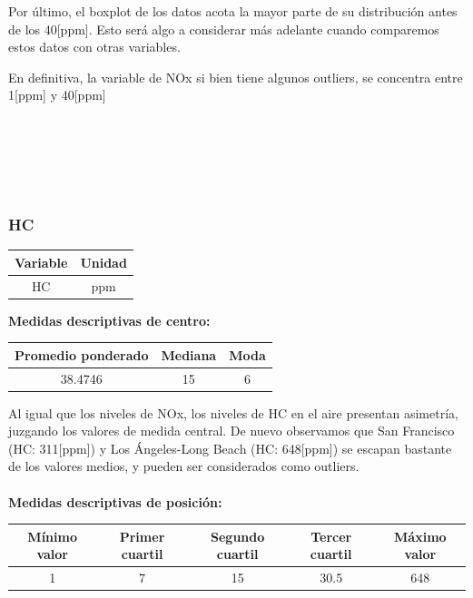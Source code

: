 \documentclass[11pt]{article}
\begin{document}
Por último, el boxplot de los datos acota la mayor parte de su distribución antes de los 40[ppm]. Esto será algo a considerar más adelante cuando comparemos estos datos con otras variables. 

En definitiva, la variable de NOx si bien tiene algunos outliers, se concentra entre 1[ppm] y 40[ppm]
\\
\\
\\
\\
\\
\\

\subsubsection{HC}

\begin{center}
\begin{tabular}{|c|c|}
    \hline
    Variable & Unidad  \\ \hline
    HC & ppm \\
    \hline
\end{tabular}
\end{center}

\textbf{Medidas descriptivas de centro:}

\begin{center}
\begin{tabular}{|c|c|c|}
    \hline
    Promedio ponderado & Mediana & Moda \\ \hline
    38.4746 & 15 & 6 \\
    \hline
\end{tabular}
\end{center}

Al igual que los niveles de NOx, los niveles de HC en el aire presentan asimetría, juzgando los valores de medida central. De nuevo observamos que San Francisco (HC: 311[ppm]) y Los Ángeles-Long Beach (HC: 648[ppm]) se escapan bastante de los valores medios, y pueden ser considerados como outliers.
\\
\\
\textbf{Medidas descriptivas de posición:}

\begin{center}
\begin{tabular}{|c|c|c|c|c|}
    \hline
    Mínimo valor & Primer cuartil & Segundo cuartil & Tercer cuartil & Máximo valor\\ \hline
    1 & 7 & 15 & 30.5 & 648\\
    \hline
\end{tabular}
\end{center}
\end{document}
